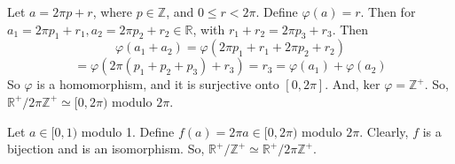 \documentclass[12pt]{article}
\begin{document}
\begin{itemize}
Let $a = 2\pi p + r$, where $p \in \mathbb{Z}$, and $0 \leq r < 2\pi$. Define $\varphi(a) = r$. Then for $a_1 = 2 \pi p_1 + r_1, a_2 = 2\pi p_2 + r_2 \in \mathbb{R}$, with $r_1 + r_2 = 2\pi p_3 + r_3$. Then
$$\varphi(a_1 + a_2) = \varphi(2\pi p_1 + r_1 + 2\pi p_2 + r_2)$$
$$= \varphi(2\pi(p_1 + p_2 + p_3) + r_3) = r_3 = \varphi(a_1) + \varphi(a_2)$$
So $\varphi$ is a homomorphism, and it is surjective onto $[0, 2\pi]$. And, $\text{ker }\varphi = \mathbb{Z}^+$. So, $\mathbb{R}^+/2\pi\mathbb{Z}^+ \simeq [0, 2\pi)$ modulo $2\pi$.

Let $a \in [0, 1)$ modulo 1. Define $f(a) = 2\pi a \in [0, 2\pi)$ modulo $2\pi$. Clearly, $f$ is a bijection and is an isomorphism. So, $\mathbb{R}^+/\mathbb{Z}^+ \simeq \mathbb{R}^+/2\pi\mathbb{Z}^+$.
\end{itemize}
\end{document}

